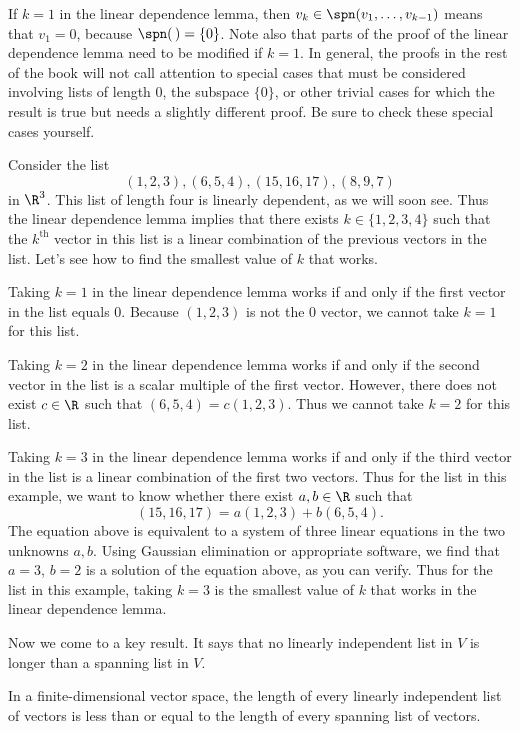 If $k=1$ in the linear dependence lemma, then $v_k\in\spn(v_1,\dots,v_{k-1})$
means that $v_1=0$, because $\spn(\,)=\{0\}$. Note also that parts of the proof
of the linear dependence lemma need to be modified if $k=1$. In general, the
proofs in the rest of the book will not call attention to special cases that
must be considered involving lists of length $0$, the subspace $\{0\}$, or
other trivial cases for which the result is true but needs a slightly
different proof. Be sure to check these special cases yourself.

\begin{example}\label{ax:2.21}
Consider the list
\[ (1,2,3),(6,5,4),(15,16,17),(8,9,7) \]
in $\R^3$. This list of length four is linearly dependent, as we will soon see.
Thus the linear dependence lemma implies that there exists $k\in\{1,2,3,4\}$
such that the $k^{\text{th}}$ vector in this list is a linear combination of
the previous vectors in the list. Let's see how to find the smallest value of
$k$ that works.

Taking $k=1$ in the linear dependence lemma works if and only if the first
vector in the list equals $0$. Because $(1,2,3)$ is not the $0$ vector, we
cannot take $k=1$ for this list.

Taking $k=2$ in the linear dependence lemma works if and only if the second
vector in the list is a scalar multiple of the first vector. However, there
does not exist $c\in\R$ such that $(6,5,4)=c(1,2,3)$. Thus we cannot take
$k=2$ for this list.

Taking $k=3$ in the linear dependence lemma works if and only if the third
vector in the list is a linear combination of the first two vectors. Thus for
the list in this example, we want to know whether there exist $a,b\in\R$ such
that
\[ (15,16,17) = a(1,2,3)+b(6,5,4). \]
The equation above is equivalent to a system of three linear equations in the
two unknowns $a,b$. Using Gaussian elimination or appropriate software, we find
that $a=3$, $b=2$ is a solution of the equation above, as you can verify. Thus
for the list in this example, taking $k=3$ is the smallest value of $k$ that
works in the linear dependence lemma.
\end{example}

Now we come to a key result. It says that no linearly independent list in $V$
is longer than a spanning list in $V$.

\begin{result}\label{ax:2.22}
In a finite-dimensional vector space, the length of every linearly independent
list of vectors is less than or equal to the length of every spanning list of
vectors.
\end{result}

